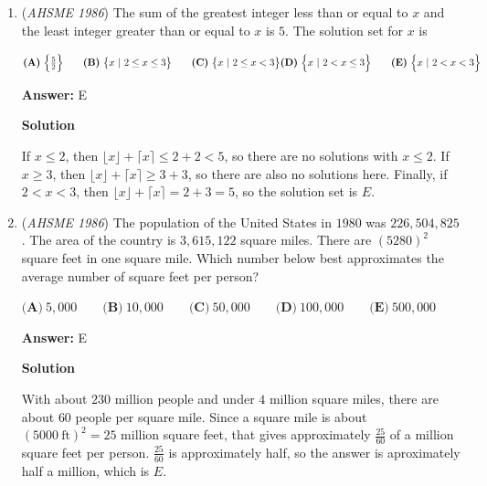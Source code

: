 \begin{enumerate}
$\textbf{(A) }28\text{ inches}\qquad\textbf{(B) }29\text{ inches}\qquad\textbf{(C) }30\text{ inches}\qquad\textbf{(D) }31\text{ inches}\qquad\textbf{(E) }32\text{ inches}$

 \textbf{Answer: }C



\textbf{Solution}

Let $h$, $l$, and $w$ represent the height of the table and the length and width of the wood blocks, respectively, in inches. From Figure 1, we have $l+h-w=32$, and from Figure 2, $w+h-l=28$. Adding the equations gives $2h=60 \implies h=30$, which is $\boxed{C}$.

 


	\item (\textit{AHSME 1986}) The sum of the greatest integer less than or equal to $x$ and the least integer greater than or equal to $x$ is $5$. The solution set for $x$ is


 $\textbf{(A)}\ \Big\{\frac{5}{2}\Big\}\qquad \textbf{(B)}\ \big\{x\ |\ 2 \le x \le 3\big\}\qquad \textbf{(C)}\ \big\{x\ |\ 2\le x < 3\big\}\qquad\\  \textbf{(D)}\ \Big\{x\ |\ 2 < x\le 3\Big\}\qquad \textbf{(E)}\ \Big\{x\ |\ 2 < x < 3\Big\}$

 \textbf{Answer: }E



\textbf{Solution}

If $x \leq 2$, then $\lfloor x \rfloor + \lceil x \rceil \leq 2+2 < 5$, so there are no solutions with $x \leq 2$. If $x \geq 3$, then $\lfloor x \rfloor + \lceil x \rceil \geq 3+3$, so there are also no solutions here. Finally, if $2<x<3$, then $\lfloor x \rfloor + \lceil x \rceil = 2 + 3 = 5$, so the solution set is $\boxed{E}$.

 


	\item (\textit{AHSME 1986}) The population of the United States in $1980$ was $226,504,825$. The area of the country is $3,615,122$ square miles. There are $(5280)^{2}$ 
square feet in one square mile. Which number below best approximates the average number of square feet per person?


 $\textbf{(A)}\ 5,000\qquad \textbf{(B)}\ 10,000\qquad \textbf{(C)}\ 50,000\qquad \textbf{(D)}\ 100,000\qquad \textbf{(E)}\ 500,000$

 \textbf{Answer: }E



\textbf{Solution}

With about $230$ million people and under $4$ million square miles, there are about $60$ people per square mile. Since a square mile is about $(5000 \ \text{ft})^{2} = 25$ million square feet, that gives approximately $\frac{25}{60}$ of a million square feet per person. $\frac{25}{60}$ is approximately half, so the answer is aproximately half a million, which is $\boxed{E}$.


\end{enumerate}
